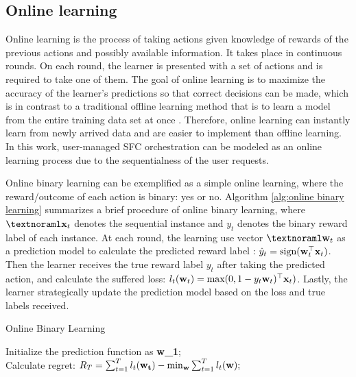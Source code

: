 \subsection{Online learning}
Online learning is the process of taking actions given knowledge of rewards of the previous actions and possibly available information. It takes place in continuous rounds. On each round, the learner is presented with a set of actions and is required to take one of them. The goal of online learning is to maximize the accuracy of the learner's predictions so that correct decisions can be made, which is in contrast to a traditional offline learning method that is to learn a model from the entire training data set at once \cite{hoi2018online}. 
Therefore, online learning can instantly learn from newly arrived data and are easier to implement than offline learning. In this work, user-managed SFC orchestration can be modeled as an online learning process due to the sequentialness of the user requests.

Online binary learning can be exemplified as a simple online learning, where the reward/outcome of each action is binary: yes or no.  Algorithm \ref{alg:online binary learning} summarizes a brief procedure of online binary learning, where $\nb{x}_t$ denotes the sequential instance and $y_t$ denotes the binary reward label of each instance. At each round, the learning use vector $\nb{w}_t$ as a prediction model to calculate the predicted reward label : $\hat{y}_t = \textnormal{sign}( \textbf{w}_t^\top \textbf{x}_t)$. Then the learner receives the true reward label $y_t$ after taking the predicted action, and calculate the suffered loss: $l_t(\textbf{w}_t) = \textnormal{max}(0,1-y_t\textbf{w}_t)^\top \textbf{x}_t)$. Lastly, the learner strategically update the prediction model based on the loss and true labels received. 
\begin{algorithm}
	\caption{Online Binary Learning}
	\label{alg:online binary learning}
	Initialize the prediction function as \textbf{w_1};\\
	\textnormal{Calculate regret:} $R_T = \sum^T_{t=1} l_t({\bf w_t}) - \min _{\bf w} \sum_{t=1}^T l_t({\bf w});$
\end{algorithm}





